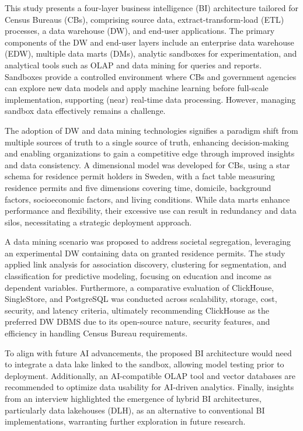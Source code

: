 This study presents a four-layer business intelligence (BI) architecture tailored for Census Bureaus (CBs), comprising source data, extract-transform-load (ETL) processes, a data warehouse (DW), and end-user applications. The primary components of the DW and end-user layers include an enterprise data warehouse (EDW), multiple data marts (DMs), analytic sandboxes for experimentation, and analytical tools such as OLAP and data mining for queries and reports. Sandboxes provide a controlled environment where CBs and government agencies can explore new data models and apply machine learning before full-scale implementation, supporting (near) real-time data processing. However, managing sandbox data effectively remains a challenge.

The adoption of DW and data mining technologies signifies a paradigm shift from multiple sources of truth to a single source of truth, enhancing decision-making and enabling organizations to gain a competitive edge through improved insights and data consistency. A dimensional model was developed for CBs, using a star schema for residence permit holders in Sweden, with a fact table measuring residence permits and five dimensions covering time, domicile, background factors, socioeconomic factors, and living conditions. While data marts enhance performance and flexibility, their excessive use can result in redundancy and data silos, necessitating a strategic deployment approach.

A data mining scenario was proposed to address societal segregation, leveraging an experimental DW containing data on granted residence permits. The study applied link analysis for association discovery, clustering for segmentation, and classification for predictive modeling, focusing on education and income as dependent variables. Furthermore, a comparative evaluation of ClickHouse, SingleStore, and PostgreSQL was conducted across scalability, storage, cost, security, and latency criteria, ultimately recommending ClickHouse as the preferred DW DBMS due to its open-source nature, security features, and efficiency in handling Census Bureau requirements.

To align with future AI advancements, the proposed BI architecture would need to integrate a data lake linked to the sandbox, allowing model testing prior to deployment. Additionally, an AI-compatible OLAP tool and vector databases are recommended to optimize data usability for AI-driven analytics. Finally, insights from an interview highlighted the emergence of hybrid BI architectures, particularly data lakehouses (DLH), as an alternative to conventional BI implementations, warranting further exploration in future research.